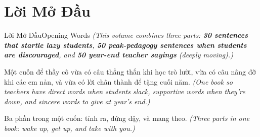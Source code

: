\chapter*{Lời Mở Đầu}

\begin{truyen}{Lời Mở Đầu}{Opening Words}
\textit{(This volume combines three parts: \textbf{30 sentences that startle lazy students}, \textbf{50 peak-pedagogy sentences when students are discouraged}, and \textbf{50 year-end teacher sayings} (deeply moving).)}

Một cuốn để thầy cô vừa có câu thẳng thắn khi học trò lười, vừa có câu nâng đỡ khi các em nản, và vừa có lời chân thành để tặng cuối năm.
\textit{(One book so teachers have direct words when students slack, supportive words when they're down, and sincere words to give at year's end.)}
\end{truyen}

\begin{baihoc}
Ba phần trong một cuốn: tỉnh ra, đứng dậy, và mang theo.
\textit{(Three parts in one book: wake up, get up, and take with you.)}
\end{baihoc}
\ngancach
